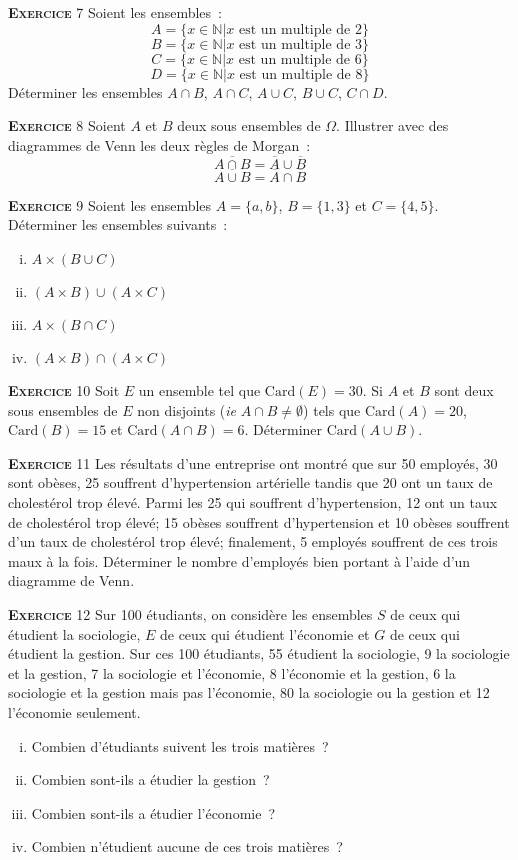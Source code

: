 \documentclass[10pt,a4paper,notitlepage]{article}
\newcommand{\exercice}[1]{\textsc{\textbf{Exercice}} #1}
\begin{document}
\bigskip

\exercice{7} Soient les ensembles :
\[
A = \{x \in \mathbb N | x \text{ est un multiple de 2}\}
\]
\[
B = \{x \in \mathbb N | x \text{ est un multiple de 3}\}
\]
\[
C = \{x \in \mathbb N | x \text{ est un multiple de 6}\}
\]
\[
D = \{x \in \mathbb N | x \text{ est un multiple de 8}\}
\]
Déterminer les ensembles $A \cap B$, $A \cap C$, $A \cup C$, $B\cup
C$, $C\cap D$.

\bigskip

\exercice{8} Soient $A$ et $B$ deux sous ensembles de
$\Omega$. Illustrer avec des diagrammes de Venn les deux règles de
Morgan :
\[
\overline{A \cap B} = \overline{A} \cup \overline{B}
\]
\[
\overline{A \cup B} = \overline{A} \cap \overline{B}
\]

\bigskip

\exercice{9} Soient les ensembles $A = \{a, b\}$, $B = \{1, 3\}$ et $C
= \{4, 5\}$. Déterminer les ensembles suivants :
\begin{enumerate}[(i)]
\item $A \times (B\cup C)$
\item $(A\times B) \cup (A\times C)$
\item $A \times (B \cap C)$
\item $(A\times B) \cap (A\times C)$
\end{enumerate}

\bigskip

\exercice{10} Soit $E$ un ensemble tel que $\mathrm{Card}(E)=30$. Si
$A$ et $B$ sont deux sous ensembles de $E$ non disjoints (\emph{ie}
$A\cap B \neq \emptyset$) tels que $\mathrm{Card}(A)=20$,
$\mathrm{Card}(B)=15$ et $\mathrm{Card}(A\cap B)=6$. Déterminer
$\mathrm{Card}(A\cup B)$.

\bigskip

\exercice{11} Les résultats d'une entreprise ont montré que sur 50
employés, 30 sont obèses, 25 souffrent d'hypertension artérielle
tandis que 20 ont un taux de cholestérol trop élevé. Parmi les 25 qui
souffrent d'hypertension, 12 ont un taux de cholestérol trop élevé; 15
obèses souffrent d'hypertension et 10 obèses souffrent d'un taux de
cholestérol trop élevé; finalement, 5 employés souffrent de ces
trois maux à la fois.  Déterminer le nombre d'employés bien portant à
l'aide d'un diagramme de Venn.

\bigskip

\exercice{12}  Sur 100 étudiants, on considère les ensembles $S$ de ceux qui étudient
la sociologie, $E$ de ceux qui étudient l'économie et $G$ de ceux qui étudient la gestion. Sur ces 100 étudiants, 55 étudient la sociologie, 9 la
sociologie et la gestion, 7 la sociologie et l'économie, 8 l'économie et la
gestion, 6 la sociologie et la gestion mais pas l'économie, 80 la sociologie
ou la gestion et 12 l'économie seulement.
\begin{enumerate}[(i)]
\item Combien d'étudiants suivent les trois matières ?
\item Combien sont-ils a étudier la gestion ?
\item Combien sont-ils a étudier l'économie ?
\item Combien n'étudient aucune de ces trois matières ?
\end{enumerate}
\end{document}
